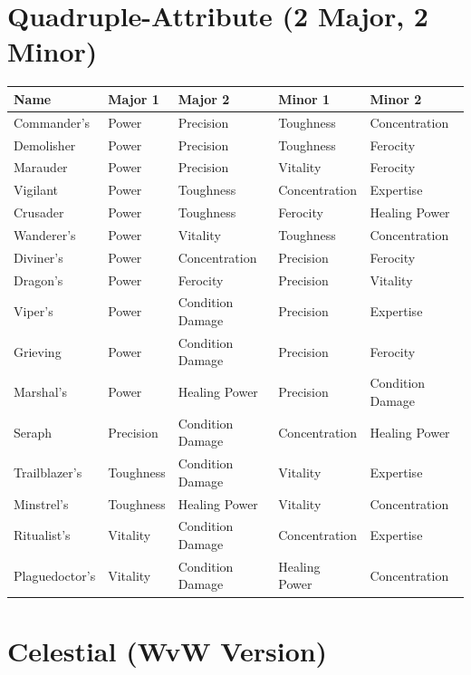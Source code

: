 \documentclass[11pt, a4paper, oneside]{book}
\begin{document}
\section{Quadruple-Attribute (2 Major, 2 Minor)}

\begin{center}
\small
\begin{longtable}{lllll}
\toprule
\textbf{Name} & \textbf{Major 1} & \textbf{Major 2} & \textbf{Minor 1} & \textbf{Minor 2} \\
\midrule
\endhead
Commander's & Power & Precision & Toughness & Concentration \\
Demolisher & Power & Precision & Toughness & Ferocity \\
Marauder & Power & Precision & Vitality & Ferocity \\
Vigilant & Power & Toughness & Concentration & Expertise \\
Crusader & Power & Toughness & Ferocity & Healing Power \\
Wanderer's & Power & Vitality & Toughness & Concentration \\
Diviner's & Power & Concentration & Precision & Ferocity \\
Dragon's & Power & Ferocity & Precision & Vitality \\
Viper's & Power & Condition Damage & Precision & Expertise \\
Grieving & Power & Condition Damage & Precision & Ferocity \\
Marshal's & Power & Healing Power & Precision & Condition Damage \\
Seraph & Precision & Condition Damage & Concentration & Healing Power \\
Trailblazer's & Toughness & Condition Damage & Vitality & Expertise \\
Minstrel's & Toughness & Healing Power & Vitality & Concentration \\
Ritualist's & Vitality & Condition Damage & Concentration & Expertise \\
Plaguedoctor's & Vitality & Condition Damage & Healing Power & Concentration \\
\bottomrule
\end{longtable}
\end{center}

\section{Celestial (WvW Version)}
\end{document}

